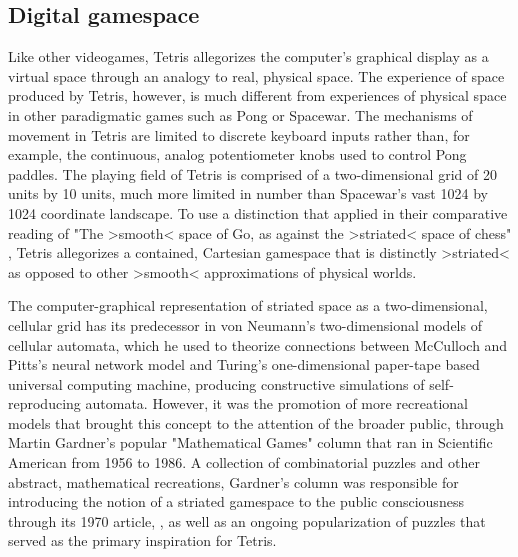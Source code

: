 \subsection*{Digital gamespace}
Like other videogames, Tetris allegorizes the computer's graphical display as a virtual space through an analogy to real, physical space. The experience of space produced by Tetris, however, is much different from experiences of physical space in other paradigmatic games such as Pong or Spacewar. The mechanisms of movement in Tetris are limited to discrete keyboard inputs rather than, for example, the continuous, analog potentiometer knobs used to control Pong paddles. The playing field of Tetris is comprised of a two-dimensional grid of 20 units by 10 units, much more limited in number than Spacewar's vast 1024 by 1024 coordinate landscape. To use a distinction that \citeauthor{DeleuzeGuattariATP} applied in their comparative reading of "The >smooth< space of Go, as against the >striated< space of chess" \autocite[353]{DeleuzeGuattariATP}, Tetris allegorizes a contained, Cartesian gamespace that is distinctly >striated< as opposed to other >smooth< approximations of physical worlds.

The computer-graphical representation of striated space as a two-dimensional, cellular grid has its predecessor in von Neumann's two-dimensional models of cellular automata, which he used to theorize connections between McCulloch and Pitts's neural network model and Turing's one-dimensional paper-tape based universal computing machine, producing constructive simulations of self-reproducing automata. However, it was the promotion of more recreational models that brought this concept to the attention of the broader public, through Martin Gardner's popular "Mathematical Games" column that ran in Scientific American from 1956 to 1986. A collection of combinatorial puzzles and other abstract, mathematical recreations, Gardner's column was responsible for introducing the notion of a striated gamespace to the public consciousness through its 1970 article, , as well as an ongoing popularization of  puzzles that served as the primary inspiration for Tetris.

